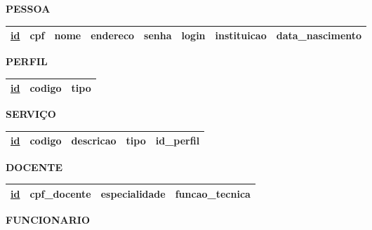 \documentclass{article}
\begin{document}
\noindent
\textbf{PESSOA}
\vspace{-5pt}

\begin{table}[H]
  \renewcommand{\arraystretch}{1.5}
  \begin{tabular}{|c|c|c|c|c|c|c|c|}
    \hline
    \underline{id} &
    cpf &
    nome & 
    endereco &
    senha &
    login &
    instituicao &
    data\_nascimento \\
    \hline
  \end{tabular}
\end{table}

\noindent
\textbf{PERFIL}
\vspace{-5pt}

\begin{table}[H]
  \renewcommand{\arraystretch}{1.5}
  \begin{tabular}{|c|c|c|}
    \hline
    
    \underline{id} &
    codigo &
    tipo  \\
    \hline
  \end{tabular}
\end{table}

\noindent
\textbf{SERVIÇO}
\vspace{-5pt}

\begin{table}[H]
  \renewcommand{\arraystretch}{1.5}
  \begin{tabular}{|c|c|c|c|c|}
    \hline
    \underline{id} &
    codigo &
    descricao &
    tipo &
    id\_perfil \\
    \hline
  \end{tabular}
\end{table}

\noindent
\textbf{DOCENTE}
\vspace{-5pt}

\begin{table}[H]
  \renewcommand{\arraystretch}{1.5}
  \begin{tabular}{|c|c|c|c|}
    \hline
    \underline{id} &
    cpf\_docente &
    especialidade &
    funcao\_tecnica \\
    \hline
  \end{tabular}
\end{table}

\noindent
\textbf{FUNCIONARIO}
\vspace{-5pt}
\end{document}
